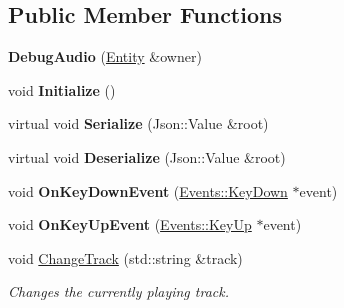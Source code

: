 \subsection*{Public Member Functions}
\begin{DoxyCompactItemize}
\item 
\hypertarget{classDCEngine_1_1Components_1_1DebugAudio_acd62559a4fe42b591f51e10a5f65fb55}{{\bfseries Debug\-Audio} (\hyperlink{classDCEngine_1_1Entity}{Entity} \&owner)}\label{classDCEngine_1_1Components_1_1DebugAudio_acd62559a4fe42b591f51e10a5f65fb55}

\item 
\hypertarget{classDCEngine_1_1Components_1_1DebugAudio_ae6c4b191bd9918bcf21fabb4eda1aa01}{void {\bfseries Initialize} ()}\label{classDCEngine_1_1Components_1_1DebugAudio_ae6c4b191bd9918bcf21fabb4eda1aa01}

\item 
\hypertarget{classDCEngine_1_1Components_1_1DebugAudio_a9523b0bddda77ff319a8095dbc3e5388}{virtual void {\bfseries Serialize} (Json\-::\-Value \&root)}\label{classDCEngine_1_1Components_1_1DebugAudio_a9523b0bddda77ff319a8095dbc3e5388}

\item 
\hypertarget{classDCEngine_1_1Components_1_1DebugAudio_a3d3d071d538ea58e809f0a90fa4ee462}{virtual void {\bfseries Deserialize} (Json\-::\-Value \&root)}\label{classDCEngine_1_1Components_1_1DebugAudio_a3d3d071d538ea58e809f0a90fa4ee462}

\item 
\hypertarget{classDCEngine_1_1Components_1_1DebugAudio_a27c68decdddba9f7cbc76c94046239b2}{void {\bfseries On\-Key\-Down\-Event} (\hyperlink{classDCEngine_1_1Events_1_1KeyDown}{Events\-::\-Key\-Down} $\ast$event)}\label{classDCEngine_1_1Components_1_1DebugAudio_a27c68decdddba9f7cbc76c94046239b2}

\item 
\hypertarget{classDCEngine_1_1Components_1_1DebugAudio_a0bcb6354208a3e2753a1f6057adfcdbd}{void {\bfseries On\-Key\-Up\-Event} (\hyperlink{classDCEngine_1_1Events_1_1KeyUp}{Events\-::\-Key\-Up} $\ast$event)}\label{classDCEngine_1_1Components_1_1DebugAudio_a0bcb6354208a3e2753a1f6057adfcdbd}

\item 
void \hyperlink{classDCEngine_1_1Components_1_1DebugAudio_a4d3332809c4607dea35a5f98e2ce4fb0}{Change\-Track} (std\-::string \&track)
\begin{DoxyCompactList}\small\item\em Changes the currently playing track. \end{DoxyCompactList}\end{DoxyCompactItemize}

